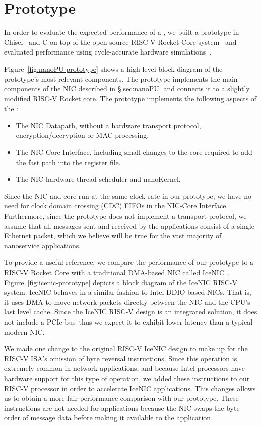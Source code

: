 \section{\name{} Prototype}
\label{sec:prototype}
In order to evaluate the expected performance of a \name{}, we built a prototype in Chisel~\cite{chisel} and C on top of the open source RISC-V Rocket Core system~\cite{rocket-chip} and evaluated performance using cycle-accurate hardware simulations~\cite{verilator}.

Figure~\ref{fig:nanoPU-prototype} shows a high-level block diagram of the prototype's most relevant components.
The prototype implements the main components of the NIC described in \S\ref{sec:nanoPU} and connects it to a slightly modified RISC-V Rocket core.
The prototype implements the following aspects of the \name{}:
\begin{itemize}
    \item The NIC Datapath, without a hardware transport protocol, encryption/decryption or MAC processing.
    \item The NIC-Core Interface, including small changes to the core required to add the fast path into the register file.
    \item The NIC hardware thread scheduler and nanoKernel.
\end{itemize}
Since the NIC and core run at the same clock rate in our prototype, we have no need for clock domain crossing (CDC) FIFOs in the NIC-Core Interface. 
Furthermore, since the prototype does not implement a transport protocol, we assume that all messages sent and received by the applications consist of a single Ethernet packet, which we believe will be true for the vast majority of nanoservice applications.

To provide a useful reference, we compare the performance of our \name{} prototype to a RISC-V Rocket Core with a traditional DMA-based NIC called IceNIC~\cite{firesim}.
Figure~\ref{fig:icenic-prototype} depicts a block diagram of the IceNIC RISC-V system.
IceNIC behaves in a similar fashion to Intel DDIO based NICs.
That is, it uses DMA to move network packets directly between the NIC and the CPU's last level cache.
Since the IceNIC RISC-V design is an integrated solution, it does not include a PCIe bus--thus we expect it to exhibit lower latency than a typical modern NIC.

We made one change to the original RISC-V IceNIC design to make up for the RISC-V ISA's omission of byte reversal instructions.
Since this operation is extremely common in network applications, and because Intel processors have hardware support for this type of operation, we added these instructions to our RISC-V processor in order to accelerate IceNIC applications.
This changes allows us to obtain a more fair performance comparison with our \name{} prototype.
These instructions are not needed for \name{} applications because the NIC swaps the byte order of message data before making it available to the application.

